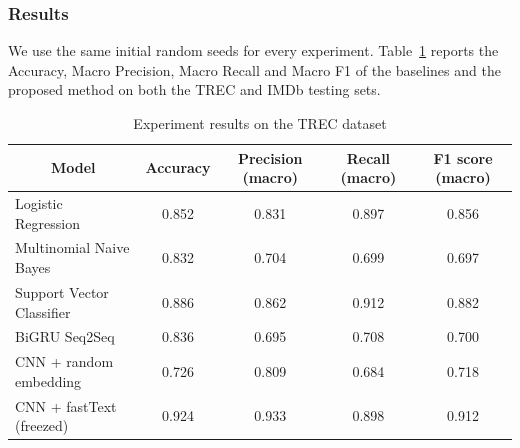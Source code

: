 \documentclass[sn-mathphys,Numbered]{sn-jnl}%
\theoremstyle{thmstyleone}%
\theoremstyle{thmstyletwo}%
\theoremstyle{thmstylethree}%
\begin{document}
\subsubsection{Results}
We use the same initial random seeds for every experiment. Table~\ref{tab:result} reports the Accuracy, Macro Precision, Macro Recall and Macro F1 of the baselines and the proposed method on both the TREC and IMDb testing sets.

\begin{table}
\caption{Experiment results on the TREC dataset} \label{tab:result}
\begin{tabular*}{\textwidth}{@{\extracolsep\fill}lcccc}
\toprule
\multicolumn{1}{c}{\textbf{Model}}                    & \multicolumn{1}{c}{\textbf{Accuracy}} & \multicolumn{1}{c}{\textbf{Precision (macro)}} & \multicolumn{1}{c}{\textbf{Recall (macro)}} & \multicolumn{1}{c}{\textbf{F1 score (macro)}} \\ \midrule
Logistic Regression                                   & 0.852                                 & 0.831                                          & 0.897                                       & 0.856                                         \\
Multinomial Naive Bayes                               & 0.832                                 & 0.704                                          & 0.699                                       & 0.697                                         \\
Support Vector Classifier                             & 0.886                                 & 0.862                                          & 0.912                                       & 0.882                                         \\ \midrule
BiGRU Seq2Seq            & 0.836                                 & 0.695                                          & 0.708                                       & 0.700                                         \\ \midrule
CNN + random embedding                 & 0.726                                 & 0.809                                          & 0.684                                       & 0.718                                         \\
CNN + fastText (freezed)                           & 0.924                                 & 0.933                                          & 0.898                                       & 0.912                                         \\

\end{tabular*}
\end{table}
\end{document}
